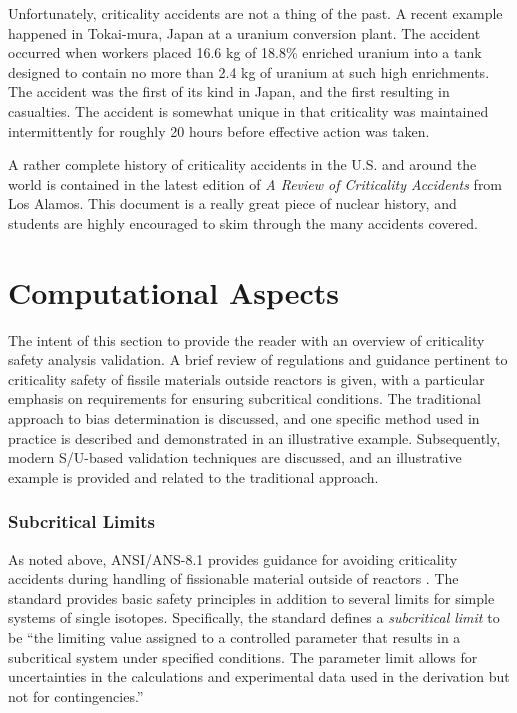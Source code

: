 Unfortunately, criticality accidents are not a thing of the past.  A 
recent example happened in Tokai-mura, Japan at a uranium conversion
plant.  The accident occurred when workers placed 16.6 kg of 18.8\%
enriched uranium into a tank designed to contain no more than
2.4 kg of uranium at such high enrichments.  The accident was the 
first of its kind in Japan, and the first resulting in casualties.
The accident is somewhat unique in that criticality was maintained
intermittently for roughly 20 hours before effective action was
taken.  

A rather complete history of criticality accidents in the U.S. and
around the world is contained in the latest edition of
 \textit{A Review of Criticality Accidents} from Los Alamos.  This
document is a really great piece of nuclear history, and students
are highly encouraged to skim through the many accidents covered.


\section*{Computational Aspects}

The intent of this section to provide the reader with an 
overview of criticality safety analysis validation. A brief 
review of regulations and guidance pertinent to criticality safety of 
fissile materials outside reactors is given, with a particular emphasis on 
requirements for ensuring subcritical conditions. The traditional approach to 
bias determination is discussed, and one specific method used in practice
is described and demonstrated in an illustrative example. Subsequently, 
modern S/U-based validation techniques are discussed, and an 
illustrative example is provided and related to the traditional approach.


\subsubsection{Subcritical Limits}

As noted above, ANSI/ANS-8.1 provides guidance 
for avoiding criticality accidents during handling of fissionable material 
outside of reactors \cite{ans8_1}. The standard provides basic safety principles 
in addition to several limits for simple systems of single isotopes.  
Specifically, the standard defines a \textit{subcritical limit} to be ``the 
limiting value assigned to a controlled parameter that results in a subcritical 
system under specified conditions. The parameter limit allows for 
uncertainties in the calculations and experimental data used in the derivation 
but not for contingencies.''

